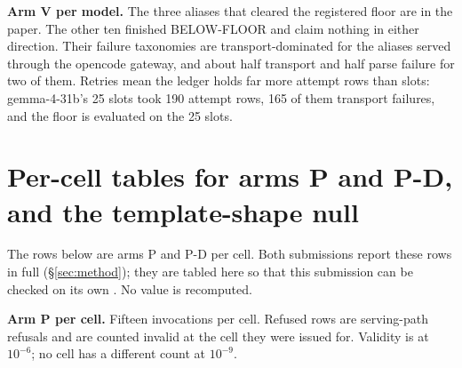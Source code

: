 \textbf{Arm V per model.} The three aliases that cleared the registered floor are in the
paper. The other ten finished BELOW-FLOOR and claim nothing in either direction. Their
failure taxonomies are transport-dominated for the aliases served through the opencode
gateway, and about half
transport and half parse failure for two of them. Retries mean the ledger holds far more
attempt rows than slots: gemma-4-31b's 25 slots took 190 attempt rows, 165 of them transport
failures, and the floor is evaluated on the 25 slots.

\section{Per-cell tables for arms P and P-D, and the template-shape null}\label{supp:transfer-p}

The rows below are arms P and P-D per cell. Both submissions report these rows in full
(\S\ref{sec:method}); they are tabled here so that this submission can be checked on its own
\citep{companion}. No value is recomputed.

\textbf{Arm P per cell.} Fifteen invocations per cell. Refused rows are serving-path refusals
and are counted invalid at the cell they were issued for. Validity is at $10^{-6}$; no cell
has a different count at $10^{-9}$.

